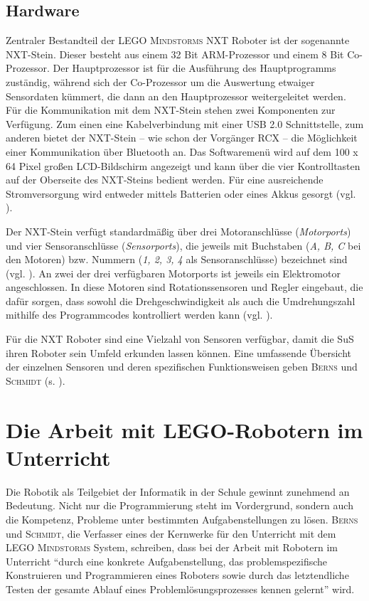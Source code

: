 \documentclass[paper=a4, DIV=calc, BCOR=12mm, twoside=on, onecolumn=on, open = right, titlepage =on, parskip =half-, headsepline = on, footsepline = off, chapterprefix = off, appendixprefix = on, fontsize = 12pt, numbers = noenddot, abstract = on]{scrbook}
\begin{document}
\subsection{Hardware}
\onehalfspacing
Zentraler Bestandteil der \textsc{LEGO Mindstorms} NXT Roboter ist der sogenannte NXT-Stein. Dieser besteht aus einem 32 Bit ARM-Prozessor und einem 8 Bit Co-Prozessor. Der Hauptprozessor ist für die Ausführung des Hauptprogramms zuständig, während sich der Co-Prozessor um die Auswertung etwaiger Sensordaten kümmert, die dann an den Hauptprozessor weitergeleitet werden. Für die Kommunikation mit dem NXT-Stein stehen zwei Komponenten zur Verfügung. Zum einen eine Kabelverbindung mit einer USB 2.0 Schnittstelle, zum anderen bietet der NXT-Stein -- wie schon der Vorgänger RCX -- die Möglichkeit einer Kommunikation über Bluetooth an. Das Softwaremenü wird auf dem 100 x 64 Pixel großen LCD-Bildschirm angezeigt und kann über die vier Kontrolltasten auf der Oberseite des NXT-Steins bedient werden. Für eine ausreichende Stromversorgung wird entweder mittels Batterien oder eines Akkus gesorgt (vgl. \cite[S.42]{berns:10}).

Der NXT-Stein verfügt standardmäßig über drei Motoranschlüsse (\emph{Motorports}) und vier Sensoranschlüsse (\emph{Sensorports}), die jeweils mit Buchstaben (\emph{A, B, C} bei den Motoren) bzw. Nummern (\emph{1, 2, 3, 4} als Sensoranschlüsse) bezeichnet sind (vgl.  \cite[S.43]{berns:10}). An zwei der drei verfügbaren Motorports ist jeweils ein Elektromotor angeschlossen. In diese Motoren sind Rotationssensoren und Regler eingebaut, die dafür sorgen, dass sowohl die Drehgeschwindigkeit als auch die Umdrehungszahl mithilfe des Programmcodes kontrolliert werden kann (vgl. \cite[S.45--47]{berns:10}).

Für die NXT Roboter sind eine Vielzahl von Sensoren verfügbar, damit die SuS ihren Roboter sein Umfeld erkunden lassen können. Eine umfassende Übersicht der einzelnen Sensoren und deren spezifischen Funktionsweisen geben \textsc{Berns} und \textsc{Schmidt} (s. \cite[Kapitel 4.2]{berns:10}). 

\par \singlespacing
 \section{Die Arbeit mit LEGO-Robotern im Unterricht}
\onehalfspacing
Die Robotik als Teilgebiet der Informatik in der Schule gewinnt zunehmend an Bedeutung. Nicht nur die Programmierung steht im Vordergrund, sondern auch die Kompetenz, Probleme unter bestimmten Aufgabenstellungen zu lösen. \textsc{Berns} und \textsc{Schmidt}, die Verfasser eines der Kernwerke für den Unterricht mit dem \textsc{LEGO Mindstorms} System, schreiben, dass bei der Arbeit mit Robotern im Unterricht "`durch eine konkrete Aufgabenstellung, das problemspezifische Konstruieren und Programmieren eines Roboters sowie durch das letztendliche Testen der gesamte Ablauf eines Problemlösungsprozesses kennen gelernt"' \cite[S.2]{berns:10} wird.
\end{document}
